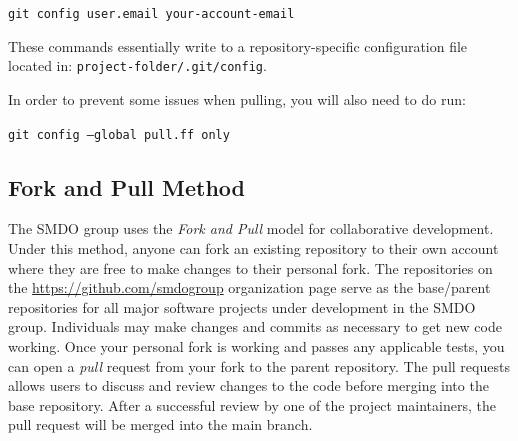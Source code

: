 \documentclass[11pt]{article}
\begin{document}
\texttt{git config user.email your-account-email}

\noindent These commands essentially write to a repository-specific configuration file located in: \newline \indent \texttt{project-folder/.git/config}.

\noindent In order to prevent some issues when pulling, you will also need to do run:

\texttt{git config --global pull.ff only}

\subsection{Fork and Pull Method}
The SMDO group uses the \emph{Fork and Pull} model for collaborative development. Under this method, anyone can fork an existing repository to their own account where they are free to make changes to their personal fork. The repositories on the \url{https://github.com/smdogroup} organization page serve as the base/parent repositories for all major software projects under development in the SMDO group. Individuals may make changes and commits as necessary to get new code working. Once your personal fork is working and passes any applicable tests, you can open a \emph{pull} request from your fork to the parent repository. The pull requests allows users to discuss and review changes to the code before merging into the base repository. After a successful review by one of the project maintainers, the pull request will be merged into the main branch.
\end{document}
